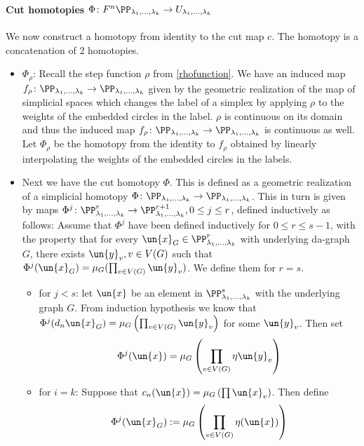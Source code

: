 \documentclass[a4paper,10pt]{amsart}
\begin{document}
	\paragraph{\textbf{Cut homotopies $\Phi \colon F^n \PP_{\lambda_1,...,\lambda_k}\to U_{\lambda_1,...,\lambda_k}$}}
	We now construct a homotopy from identity to the cut map $c$. The homotopy is a concatenation of $2$ homotopies.\\
\begin{itemize}
	\item $\Phi_{\rho}$: Recall the step function $\rho$ from \ref{rhofunction}. We have an induced map $f_{\rho} \colon \PP_{\lambda_1,...,\lambda_k}\to \PP_{\lambda_1,...,\lambda_k}$ given by the geometric realization of the map of simplicial spaces which changes the label of a simplex by applying $\rho$ to the weights of the embedded circles in the label. $\rho$ is continuous on its domain and thus the induced map $f_{\rho} \colon \PP_{\lambda_1,...,\lambda_k}\to \PP_{\lambda_1,...,\lambda_k}$ is continuous as well. Let $\Phi_{\rho}$ be the homotopy from the identity to $f_{\rho}$ obtained by linearly interpolating the weights of the embedded circles in the labels.
	\item Next we have the cut homotopy $\Phi$. This is defined as a geometric realization of a simplicial homotopy $\Phi \colon \PP_{{\lambda_1,...,\lambda_k}} \to \PP_{{\lambda_1,...,\lambda_k}}$. This in turn is given by maps $\Phi^j \colon \PP_{{\lambda_1,...,\lambda_k}}^r \to \PP_{{\lambda_1,...,\lambda_k}}^{r+1}, 0 \leq j \leq r $, defined inductively as follows:
	Assume that $\Phi^j$ have been defined inductively for $0 \leq r \leq s-1$, with the property that for every $\un{x}_{G} \in \PP_{{\lambda_1,...,\lambda_k}}^r$ with underlying da-graph $G$, there exists $\un{y}_v, v \in V(G)$ such that $\Phi^j(\un{x}_{G}) = \mu_{G} ( \prod_{v \in V(G)} \un{y}_v )$. We define them for $r=s$.
	\begin{itemize}
		\item for $j<s$: let $\un{x}$ be an element in $\PP_{{\lambda_1,...,\lambda_k}}^s$ with the underlying graph $G$. From induction hypothesis we know that $\Phi^j(d_n \un{x}_G) = \mu_G \left( \prod_{v \in V(G)} \un{y}_v \right)$ for some $\un{y}_v$. Then set
		\[ \Phi^j(\un{x}) = \mu_G \left( \prod_{v \in V(G)} \eta \un{y}_v \right) \]
		\item for $i=k$: Suppose that $c_n(\un{x}) = \mu_G \left( \prod \un{x}_v \right)$. Then define 
		\[ \Phi^j(\un{x}_G) := \mu_G \left( \prod_{v \in V(G)} \eta(\un{x})\right)\]
	\end{itemize}
\end{itemize}
\end{document}
